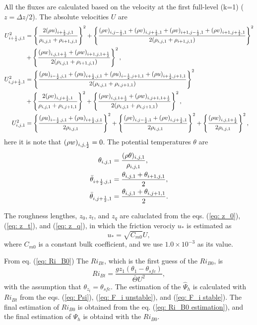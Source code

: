 All the fluxes are calculated based on the velocity at the first full-level (k=1)
($z=\Delta z/2$).
The absolute velocities $U$ are
\begin{align}
  U_{i+\frac{1}{2},j,1}^2 &=
    \left\{\frac{2(\rho u)_{i+\frac{1}{2},j,1}}{\rho_{i,j,1}+\rho_{i+1,j,1}}\right\}^2
  + \left\{\frac{(\rho v)_{i,j-\frac{1}{2},1} + (\rho v)_{i,j+\frac{1}{2},1} + (\rho v)_{i+1,j-\frac{1}{2},1} + (\rho v)_{i+1,j+\frac{1}{2},1}}{2(\rho_{i,j,1}+\rho_{i+1,j,1})}\right\}^2 \nonumber \\
 &+ \left\{\frac{(\rho w)_{i,j,1+\frac{1}{2}} + (\rho w)_{i+1,j,1+\frac{1}{2}}}{2(\rho_{i,j,1}+\rho_{i+1,j,1})}\right\}^2, \\
  U_{i,j+\frac{1}{2},1}^2 &=
    \left\{\frac{(\rho u)_{i-\frac{1}{2},j,1} + (\rho u)_{i+\frac{1}{2},j,1} + (\rho u)_{i-\frac{1}{2},j+1,1} + (\rho u)_{i+\frac{1}{2},j+1,1}}{2(\rho_{i,j,1}+\rho_{i,j+1,1})}\right\}^2 \nonumber\\
 &+ \left\{\frac{2(\rho v)_{i,j+\frac{1}{2},1}}{\rho_{i,j,1}+\rho_{i,j+1,1}}\right\}^2
  + \left\{\frac{(\rho w)_{i,j,1+\frac{1}{2}} + (\rho w)_{i,j+1,1+\frac{1}{2}}}{2(\rho_{i,j,1}+\rho_{i,j+1,1})}\right\}^2, \\
  U_{i,j,1}^2 &=
    \left\{\frac{(\rho u)_{i-\frac{1}{2},j,1} + (\rho u)_{i+\frac{1}{2},j,1}}{2\rho_{i,j,1}}\right\}^2
  + \left\{\frac{(\rho v)_{i,j-\frac{1}{2},1} + (\rho v)_{i,j+\frac{1}{2},1}}{2\rho_{i,j,1}}\right\}^2
  + \left\{\frac{(\rho w)_{i,j,1+\frac{1}{2}}}{2\rho_{i,j,1}}\right\}^2,
\end{align}
here it is note that $(\rho w)_{i,j,\frac{1}{2}}=0$.
The potential temperatures $\theta$ are
\begin{align}
  \theta_{i,j,1} &= \frac{(\rho \theta)_{i,j,1}}{\rho_{i,j,1}}, \\
  \bar{\theta}_{i+\frac{1}{2},j,1} &= \frac{\theta_{i,j,1}+\theta_{i+1,j,1}}{2}, \\
  \bar{\theta}_{i,j+\frac{1}{2},1} &= \frac{\theta_{i,j,1}+\theta_{i,j+1,1}}{2}.
\end{align}

The roughness lengthes, $z_0, z_t$, and $z_q$ are caluclated from
the eqs. (\ref{eq: z_0}), (\ref{eq: z_t}), and (\ref{eq: z_q}),
in which the friction verociy $u_*$ is estimated as
\begin{equation}
  u_* = \sqrt{C_{m0}} U,
\end{equation}
where $C_{m0}$ is a constant bulk coefficient,
and we use $1.0 \times 10^{-3}$ as its value.

From eq. (\ref{eq: Ri_B0})
The $Ri_{Bt}$, which is the first guess of the $Ri_{B0}$, is
\begin{equation}
  Ri_{Bt} = \frac{gz_1(\theta_1-\theta_{sfc})}{\bar{\Theta}U^2},
\end{equation}
with the assumption that $\theta_{z_t} = \theta_{sfc}$.
The estimation of the $\hat{\Psi}_h$ is calculated with $Ri_{Bt}$ from
the eqs. (\ref{eq: Psi}), (\ref{eq: F_i unstable}), and (\ref{eq: F_i stable}).
The final estimation of $Ri_{B0}$ is obtained from the eq. (\ref{eq: Ri_B0 estimation}),
and the final estimation of $\Psi_h$ is obtaind with the $Ri_{B0}$.

